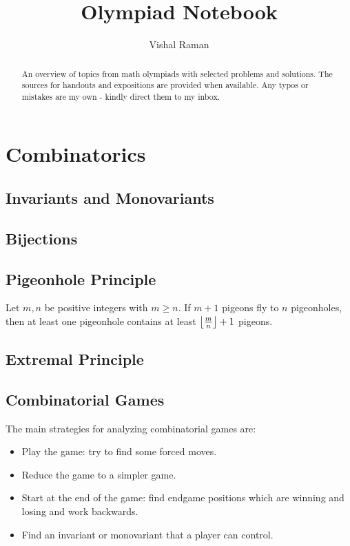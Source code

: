 \documentclass[11pt]{article}
\renewcommand{\>}{\rangle}
\newcommand{\<}{\langle}
\begin{document}
\title{Olympiad Notebook}
\author{Vishal Raman}
\maketitle
\begin{abstract}
An overview of topics from math olympiads with selected problems and solutions.  The sources for handouts and expositions are provided when available.  Any typos or mistakes are my own - kindly direct them to my inbox.  
\end{abstract}
\tableofcontents
\pagebreak
\section{Combinatorics}

\subsection{Invariants and Monovariants}

\subsection{Bijections}

\subsection{Pigeonhole Principle}
\begin{theorem} Let $m, n$ be positive integers with $m \ge n$.  If $m+1$ pigeons fly to $n$ pigeonholes, then at least one pigeonhole contains at least $\left\lfloor \frac{m}{n} \right\rfloor + 1$ pigeons.
\end{theorem}
\subsection{Extremal Principle}
\subsection{Combinatorial Games}
The main strategies for analyzing combinatorial games are:
\begin{itemize}
\item Play the game: try to find some forced moves.
\item Reduce the game to a simpler game.
\item Start at the end of the game: find endgame positions which are winning and losing and work backwards.
\item Find an invariant or monovariant that a player can control.  
\end{itemize}
\end{document}
